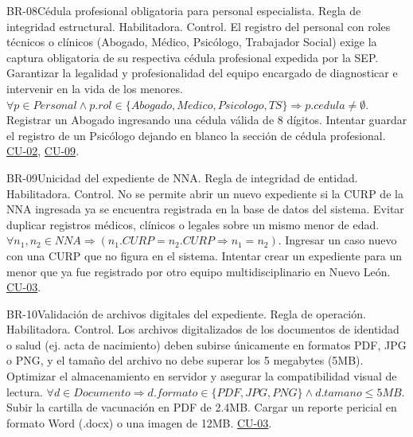 \begin{BussinesRule}{BR-08}{Cédula profesional obligatoria para personal especialista.}
	\BRitem[Tipo:] Regla de integridad estructural.
	\BRitem[Clase:] Habilitadora.
	\BRitem[Nivel:] Control.
	\BRitem[Descripción:] El registro del personal con roles técnicos o clínicos (Abogado, Médico, Psicólogo, Trabajador Social) exige la captura obligatoria de su respectiva cédula profesional expedida por la SEP.
	\BRitem[Motivación:] Garantizar la legalidad y profesionalidad del equipo encargado de diagnosticar e intervenir en la vida de los menores.
	\BRitem[Sentencia:] $\forall p \in Personal \land p.rol \in \{Abogado, Medico, Psicologo, TS\} \Rightarrow p.cedula \neq \emptyset$.
	 Registrar un Abogado ingresando una cédula válida de 8 dígitos.
	 Intentar guardar el registro de un Psicólogo dejando en blanco la sección de cédula profesional.
	 \hyperlink{CU-02}{CU-02}, \hyperlink{CU-09}{CU-09}.
\end{BussinesRule}

\begin{BussinesRule}{BR-09}{Unicidad del expediente de NNA.}
	\BRitem[Tipo:] Regla de integridad de entidad.
	\BRitem[Clase:] Habilitadora.
	\BRitem[Nivel:] Control.
	\BRitem[Descripción:] No se permite abrir un nuevo expediente si la CURP de la NNA ingresada ya se encuentra registrada en la base de datos del sistema.
	\BRitem[Motivación:] Evitar duplicar registros médicos, clínicos o legales sobre un mismo menor de edad.
	\BRitem[Sentencia:] $\forall n_1, n_2 \in NNA \Rightarrow (n_1.CURP = n_2.CURP \Rightarrow n_1 = n_2)$.
	 Ingresar un caso nuevo con una CURP que no figura en el sistema.
	 Intentar crear un expediente para un menor que ya fue registrado por otro equipo multidisciplinario en Nuevo León.
	 \hyperlink{CU-03}{CU-03}.
\end{BussinesRule}

\begin{BussinesRule}{BR-10}{Validación de archivos digitales del expediente.}
	\BRitem[Tipo:] Regla de operación.
	\BRitem[Clase:] Habilitadora.
	\BRitem[Nivel:] Control.
	\BRitem[Descripción:] Los archivos digitalizados de los documentos de identidad o salud (ej. acta de nacimiento) deben subirse únicamente en formatos PDF, JPG o PNG, y el tamaño del archivo no debe superar los 5 megabytes (5MB).
	\BRitem[Motivación:] Optimizar el almacenamiento en servidor y asegurar la compatibilidad visual de lectura.
	\BRitem[Sentencia:] $\forall d \in Documento \Rightarrow d.formato \in \{PDF, JPG, PNG\} \land d.tamano \le 5MB$.
	 Subir la cartilla de vacunación en PDF de 2.4MB.
	 Cargar un reporte pericial en formato Word (.docx) o una imagen de 12MB.
	 \hyperlink{CU-03}{CU-03}.
\end{BussinesRule}

